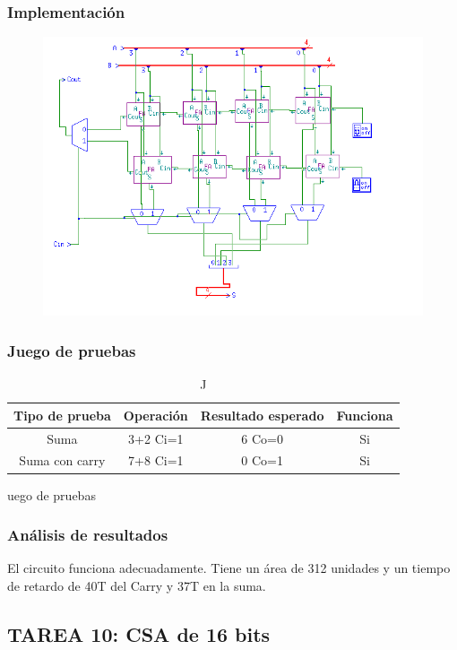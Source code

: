 \documentclass{article}
\begin{document}
		\subsubsection*{Implementación}
		 \begin{figure}[ht]
		 	\includegraphics[width=0.8\linewidth]{CSA}
		 	\centering
		 \end{figure}


		\subsubsection*{Juego de pruebas}
		\begin{table}[h]
			\begin{center}
				\begin{tabular}{| c | c | c | c |}
					\hline
					Tipo de prueba & Operación & Resultado esperado & Funciona \\ \hline
				
					Suma & 3+2 Ci=1 & 6 Co=0 & Si \\ \hline
					Suma con carry & 7+8 Ci=1 & 0 Co=1 & Si \\ \hline
			
				\end{tabular}
				\caption Juego de pruebas
			\end{center}
		\end{table}



		\subsubsection*{Análisis de resultados}
		El circuito funciona adecuadamente. Tiene un área de 312 unidades y un tiempo de retardo de 40T del Carry y 37T en la suma.

	\subsection{TAREA 10: CSA de 16 bits}
\end{document}
